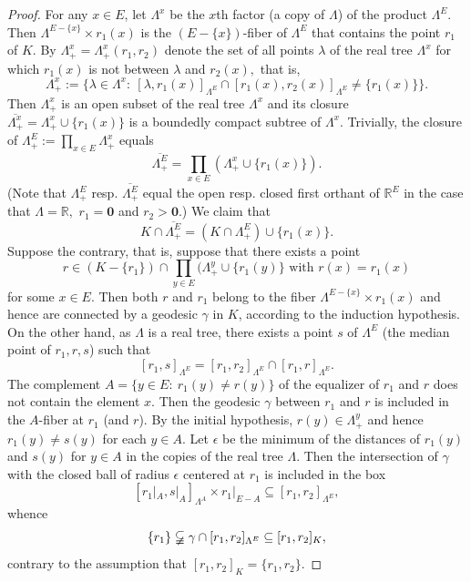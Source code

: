 \documentclass[11pt,a4paper]{amsart}
\theoremstyle{definition}
\numberwithin{equation}{section}
\begin{document}
\begin{proof}
For any $x\in E$, let $\Lambda^x$ be the $x$th factor (a copy of $\Lambda$) of the product ${\Lambda}^E$. Then $\Lambda^{E- \{ x\}}\times r_1(x)$ is the
$(E- \{ x\})$-fiber of $\Lambda^E$ that contains the point $r_1$ of $K$. By $\Lambda^x_+=\Lambda^x_+(r_1,r_2)$  denote the set of all
points $\lambda$ of the real tree
$\Lambda^x$ for which $r_1(x)$ is not between $\lambda$ and $r_2(x),$ that is,
$$\Lambda^x_+:=\{ \lambda\in \Lambda^x: ~ [\lambda,r_1(x)]_{\Lambda^E}\cap [r_1(x),r_2(x)]_{\Lambda^E}\ne \{ r_1(x)\}\}.$$
Then $\Lambda^x_+$ is an open subset of the real tree $\Lambda^x$ and its closure $\overline{\Lambda^x_+}=\Lambda^x_+\cup\{ r_1(x)\}$ is a boundedly
compact subtree of $\Lambda^x$. Trivially, the closure of $\Lambda^{E}_+:=\prod_{x\in E}\Lambda^x_+$ equals
$$\overline{\Lambda^E_+}=\prod_{x\in E} (\Lambda_+^x\cup \{ r_1(x)\}).$$
(Note that $\Lambda^E_+$ resp. $\overline{\Lambda^E_+}$ equal the open resp. closed first orthant of ${\mathbb R}^E$ in the case that $\Lambda={\mathbb R},$
$r_1={\mathbf 0}$ and $r_2>{\mathbf 0}$.)  We claim that
$${K}\cap \overline{\Lambda^{E}_+}=({K}\cap \Lambda^{E}_+)\cup \{ r_1(x)\}.$$
Suppose the contrary, that is, suppose that there exists a point $$r\in ({K}- \{ r_1\})\cap \prod_{y\in E}(\Lambda^y_+\cup \{ r_1(y)\} \mbox{ with } r(x)=r_1(x)$$
for some $x\in E$. Then both $r$ and $r_1$ belong to the fiber $\Lambda^{E- \{ x\}}\times r_1(x)$ and hence are connected by a geodesic $\gamma$ in $K$, according to the induction hypothesis. On the other hand, as $\Lambda$ is a real tree, there exists a point $s$ of $\Lambda^E$ (the median point of $r_1,r,s$) such that
$$[r_1,s]_{\Lambda^E}=[r_1,r_2]_{\Lambda^E}\cap [r_1,r]_{\Lambda^E}.$$
The complement $A=\{ y\in E: ~ r_1(y)\ne r(y)\}$ of the equalizer of $r_1$ and $r$ does not contain the element $x$. Then the geodesic $\gamma$ between $r_1$
and $r$ is included in the $A$-fiber at $r_1$ (and $r$). By the initial hypothesis, $r(y)\in \Lambda^y_+$ and hence $r_1(y)\ne s(y)$ for each $y\in A$. Let
$\epsilon$ be the minimum of the distances of $r_1(y)$ and $s(y)$ for $y\in A$ in the copies of the real tree $\Lambda$. Then the intersection of $\gamma$
with the closed ball of radius $\epsilon$ centered at $r_1$ is included in the box
$$[r_1|_{A},s|_{A}]_{\Lambda^{A}}\times r_1|_{E- A}\subseteq [r_1,r_2]_{\Lambda^E},$$
whence
$$\{ r_1\}\varsubsetneqq\gamma\cap [r_1,r_2]_{\Lambda^E}\subseteq [r_1,r_2]_{K},$$
contrary to the assumption that $[r_1,r_2]_{K}=\{ r_1,r_2\}.$


\end{proof}
\end{document}
